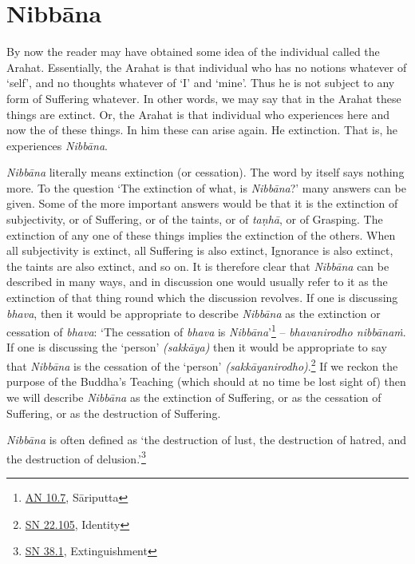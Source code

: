 \chapter{Nibbāna}

By now the reader may have obtained some idea of the individual called the Arahat. Essentially, the Arahat is that individual who has no notions whatever of `self', and no thoughts whatever of `I' and `mine'. Thus he is not subject to any form of Suffering whatever. In other words, we may say that in the Arahat these things are extinct. Or, the Arahat is that individual who experiences here and now the  of these things. In him these can  arise again. He  extinction. That is, he experiences \emph{Nibbāna}.

\emph{Nibbāna} literally means extinction (or cessation). The word by itself says nothing more. To the question `The extinction of what, is \emph{Nibbāna}?' many answers can be given. Some of the more important answers would be that it is the extinction of subjectivity, or of Suffering, or of the taints, or of \emph{taṇhā}, or of Grasping. The extinction of any one of these things implies  the extinction of the others. When all subjectivity is extinct, all Suffering is also extinct, Ignorance is also extinct, the taints are also extinct, and so on. It is therefore clear that \emph{Nibbāna} can be described in many ways, and in discussion one would usually refer to it as the extinction of that thing round which the discussion revolves. If one is discussing \emph{bhava}, then it would be appropriate to describe \emph{Nibbāna} as the extinction or cessation of \emph{bhava}: `The cessation of \emph{bhava} is \emph{Nibbāna}'\footnote{\href{https://suttacentral.net/an10.7/en/bodhi}{AN 10.7}, Sāriputta} -- \emph{bhavanirodho nibbānaṁ}. If one is discussing the `person' \emph{(sakkāya)} then it would be appropriate to say that \emph{Nibbāna} is the cessation of the `person' \emph{(sakkāyanirodho)}.\footnote{\href{https://suttacentral.net/sn22.105/en/sujato}{SN 22.105}, Identity} If we reckon the purpose of the Buddha's Teaching (which should at no time be lost sight of) then we will describe \emph{Nibbāna} as the extinction of Suffering, or as the cessation of Suffering, or as the destruction of Suffering.

\emph{Nibbāna} is often defined as `the destruction of lust, the destruction of hatred, and the destruction of delusion.'\footnote{\href{https://suttacentral.net/sn38.1/en/sujato}{SN 38.1}, Extinguishment}

